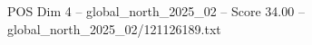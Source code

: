 \begin{textsample}{POS Dim 4 – global\_north\_2025\_02 – Score 34.00 – global\_north\_2025\_02/121126189.txt}
\end{textsample}
